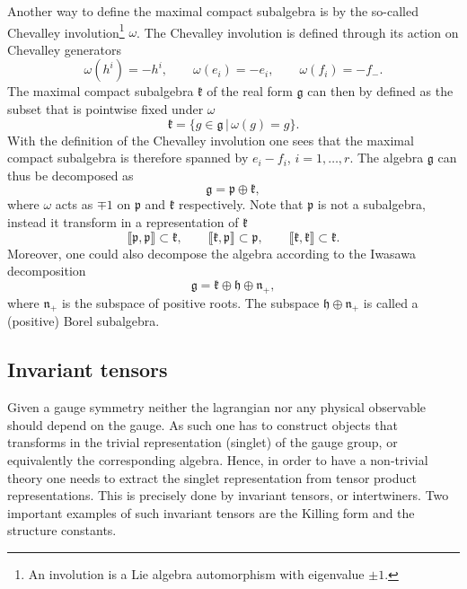 Another way to define the maximal compact subalgebra is by the so-called Chevalley involution\footnote{An involution is a Lie algebra automorphism with eigenvalue $\pm 1$.} $\omega$. The Chevalley involution is defined through its action on Chevalley generators
\begin{equation}
    \omega(h^i) = -h^i,\qquad \omega(e_i) = -e_i, \qquad \omega(f_i) = -f_-.
\end{equation}
The maximal compact subalgebra $\mathfrak{k}$ of the real form $\mathfrak{g}$ can then by defined as the subset that is pointwise fixed under $\omega$
\begin{equation}
    \mathfrak{k} = \{g\in\mathfrak{g}\,|\, \omega (g) = g \}. 
\end{equation}
With the definition of the Chevalley involution one sees that the maximal compact subalgebra is therefore spanned by $e_i-f_i$, $i=1,\ldots,r$. The algebra $\mathfrak{g}$ can thus be decomposed as 
\begin{equation}
    \mathfrak{g} = \mathfrak{p}\oplus\mathfrak{k},
\end{equation}
where $\omega$ acts as $\mp 1$ on $\mathfrak{p}$ and $\mathfrak{k}$ respectively. Note that $\mathfrak{p}$ is not a subalgebra, instead it transform in a representation of $\mathfrak{k}$ 
\begin{equation}
    \llbracket \mathfrak{p},\mathfrak{p}\rrbracket \subset \mathfrak{k},\qquad \llbracket \mathfrak{k},\mathfrak{p}\rrbracket\subset \mathfrak{p},\qquad \llbracket \mathfrak{k},\mathfrak{k}\rrbracket \subset \mathfrak{k}.
\end{equation}
Moreover, one could also decompose the algebra according to the Iwasawa decomposition 
\begin{equation}
    \mathfrak{g} = \mathfrak{k}\oplus\mathfrak{h}\oplus\mathfrak{n}_+,
\end{equation}
where $\mathfrak{n_+}$ is the subspace of positive roots. The subspace $\mathfrak{h}\oplus\mathfrak{n}_+$ is called a (positive) Borel subalgebra. 

\subsection{Invariant tensors}
Given a gauge symmetry neither the lagrangian nor any physical observable should depend on the gauge. As such one has to construct objects that transforms in the trivial representation (singlet) of the gauge group, or equivalently the corresponding algebra. Hence, in order to have a non-trivial theory one needs to extract the singlet representation from tensor product representations. This is precisely done by invariant tensors, or intertwiners. Two important examples of such invariant tensors are the Killing form and the structure constants. 

